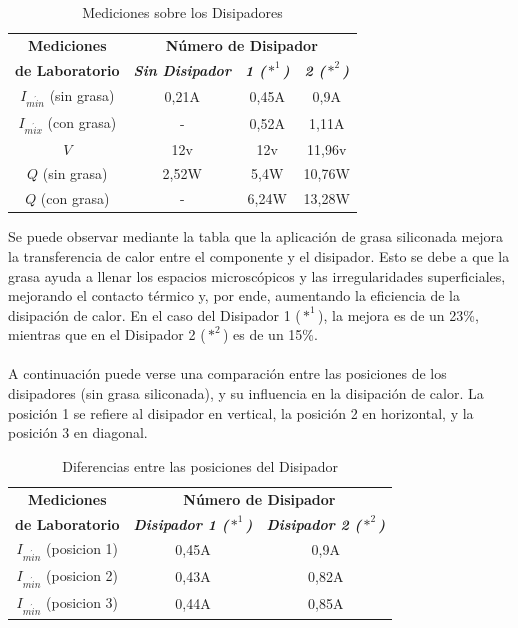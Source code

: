 \documentclass[conference]{IEEEtran}
\begin{document}
\begin{table}[htbp]
    \caption{Mediciones sobre los Disipadores}
    \begin{center}
    \begin{tabular}{|c|c|c|c|}
    \hline
    \textbf{Mediciones} & \multicolumn{3}{|c|}{\textbf{Número de Disipador}} \\
    \cline{2-4} 
    \textbf{de Laboratorio} & \textbf{\textit{Sin Disipador}} & \textbf{\textit{1 ($*^1$)}} & \textbf{\textit{2 ($*^2$)}} \\
    \hline
    $I_{m\acute{i}n}$ (sin grasa) & 0,21A & 0,45A & 0,9A \\
    \hline
    $I_{m\acute{i}x}$ (con grasa) & - & 0,52A & 1,11A \\
    \hline
    $V$ & 12v & 12v & 11,96v \\
    \hline
    $Q$ (sin grasa) & 2,52W & 5,4W & 10,76W \\
    \hline
    $Q$ (con grasa) & - & 6,24W & 13,28W \\
    \hline
    \end{tabular}
    \label{tab1}
    \end{center}
    \end{table}

    Se puede observar mediante la tabla que la aplicación de grasa siliconada mejora la transferencia de calor entre el 
    componente y el disipador. Esto se debe a que la grasa ayuda a llenar los espacios microscópicos y las irregularidades 
    superficiales, mejorando el contacto térmico y, por ende, aumentando la eficiencia de la disipación de calor. En el caso
    del Disipador 1 ($*^1$), la mejora es de un 23\%, mientras que en el Disipador 2 ($*^2$) es de un 15\%.\\ \\
    A continuación puede verse una comparación entre las posiciones de los disipadores (sin grasa siliconada), y su 
    influencia en la disipación de calor. La posición 1 se refiere al disipador en vertical, la posición 2 en 
    horizontal, y la posición 3 en diagonal.

    \begin{table}[htbp]
        \caption{Diferencias entre las posiciones del Disipador}
        \begin{center}
        \begin{tabular}{|c|c|c|}
        \hline
        \textbf{Mediciones} & \multicolumn{2}{c|}{\textbf{Número de Disipador}} \\
        \cline{2-3}
        \textbf{de Laboratorio} & \textbf{\textit{Disipador 1 ($*^1$)}} & \textbf{\textit{Disipador 2 ($*^2$)}} \\
        \hline
        $I_{m\acute{i}n}$ (posicion 1) & 0,45A & 0,9A \\
        \hline
        $I_{m\acute{i}n}$ (posicion 2) & 0,43A & 0,82A \\
        \hline
        $I_{m\acute{i}n}$ (posicion 3) & 0,44A & 0,85A \\
        \hline
        
        \end{tabular}
        \label{tab1}
        \end{center}
    \end{table}
 
\end{document}
